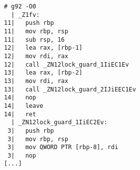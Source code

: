 \begin{lstlisting}[language={},numbers=none,title=\href{https://godbolt.org/z/MKPq35}{\texttt{godbolt.org/z/MKPq35}}]
# g92 -O0
  | _Z1fv:
11|   push rbp
11|   mov rbp, rsp
11|   sub rsp, 16
12|   lea rax, [rbp-1]
12|   mov rdi, rax
12|   call _ZN12lock_guard_1IiEC1Ev
13|   lea rax, [rbp-2]
13|   mov rdi, rax
13|   call _ZN12lock_guard_2IJiEEC1Ev
14|   nop
14|   leave
14|   ret
  | _ZN12lock_guard_1IiEC2Ev:
 3|   push rbp
 3|   mov rbp, rsp
 3|   mov QWORD PTR [rbp-8], rdi
 3|   nop
[...]
\end{lstlisting}
